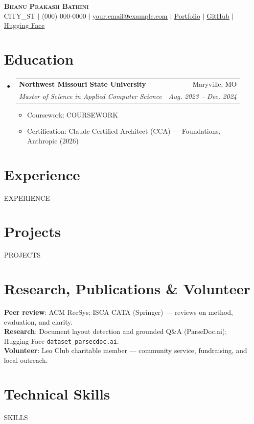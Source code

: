\documentclass[letterpaper,11pt]{article}
\makeatletter
\newcommand{\resumeItem}[1]{
  \item\small{
    {#1 \vspace{-3pt}}
  }
}
\newcommand{\resumeSubheading}[4]{
  \vspace{-2pt}\item
    \begin{tabular*}{0.97\textwidth}[t]{l@{\extracolsep{\fill}}r}
      \textbf{#1} & #2 \\
      \textit{\small#3} & \textit{\small #4} \\
    \end{tabular*}\vspace{-7pt}
}
\newcommand{\resumeSubHeadingListStart}{\begin{itemize}[leftmargin=0.15in, label={}]}
\newcommand{\resumeSubHeadingListEnd}{\end{itemize}}
\newcommand{\resumeItemListStart}{\begin{itemize}[topsep=1pt,itemsep=0pt,parsep=0pt]}
\newcommand{\resumeItemListEnd}{\end{itemize}\vspace{-8pt}}
\makeatother
\begin{document}
\begin{center}
    \textbf{\Huge \scshape Bhanu Prakash Bathini} \\ \vspace{2pt}
    \small {{CITY_ST}} $|$ (000) 000-0000 $|$
    \href{mailto:your.email@example.com}{\underline{your.email@example.com}} $|$    \href{https://your-portfolio.example.com}{\underline{Portfolio}} $|$
    \href{https://github.com/your-github}{\underline{GitHub}} $|$
    \href{https://huggingface.co/your-handle}{\underline{Hugging Face}}
\end{center}

\section{Education}
  \resumeSubHeadingListStart
    \resumeSubheading
      {Northwest Missouri State University}{Maryville, MO}
      {Master of Science in Applied Computer Science}{Aug. 2023 -- Dec. 2024}
      \resumeItemListStart
        \resumeItem{Coursework: {{COURSEWORK}}}
        \resumeItem{Certification: Claude Certified Architect (CCA) --- Foundations, Anthropic (2026)}
      \resumeItemListEnd
  \resumeSubHeadingListEnd

\section{Experience}
  \resumeSubHeadingListStart
{{EXPERIENCE}}\resumeSubHeadingListEnd

\section{Projects}
    \resumeSubHeadingListStart
{{PROJECTS}}\resumeSubHeadingListEnd

\section{Research, Publications \& Volunteer}
 \begin{itemize}[leftmargin=0.15in, label={}, topsep=1pt]
    \small{\item{
     \textbf{Peer review}{: ACM RecSys; ISCA CATA (Springer) --- reviews on method, evaluation, and clarity.} \\
     \textbf{Research}{: Document layout detection and grounded Q\&A (ParseDoc.ai); Hugging Face \texttt{dataset\_parsecdoc.ai}.} \\
     \textbf{Volunteer}{: Leo Club charitable member --- community service, fundraising, and local outreach.}
    }}
 \end{itemize}

\section{Technical Skills}
 \begin{itemize}[leftmargin=0.15in, label={}]
    \small{\item{
{{SKILLS}}
    }}
 \end{itemize}
\end{document}
